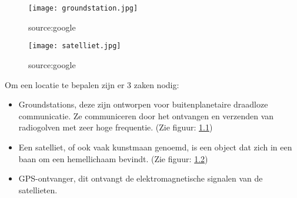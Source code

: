 \chapter{}
\label{ch:stand-van-zaken}


\section{}
\subsection{}
\begin{figure}
	\texttt{[image: groundstation.jpg]}
	\caption{source:google}
	\label{fig:groundstation}
\end{figure}
\begin{figure}
	\texttt{[image: satelliet.jpg]}
	\caption{source:google}
	\label{fig:satelliet}
\end{figure}

Om een locatie te bepalen zijn er 3 zaken nodig:
\begin{itemize}
	\item Groundstations, deze zijn ontworpen voor buitenplanetaire draadloze communicatie. Ze communiceren door het ontvangen en verzenden van radiogolven met zeer hoge frequentie. (Zie figuur: \ref{fig:groundstation})
	\item Een satelliet, of ook vaak kunstmaan genoemd, is een object dat zich in een baan om een hemellichaam bevindt. \autocite{definitie_satelliet} (Zie figuur: \ref{fig:satelliet})
	\item GPS-ontvanger, dit ontvangt de elektromagnetische signalen van de satellieten.
\end{itemize}

